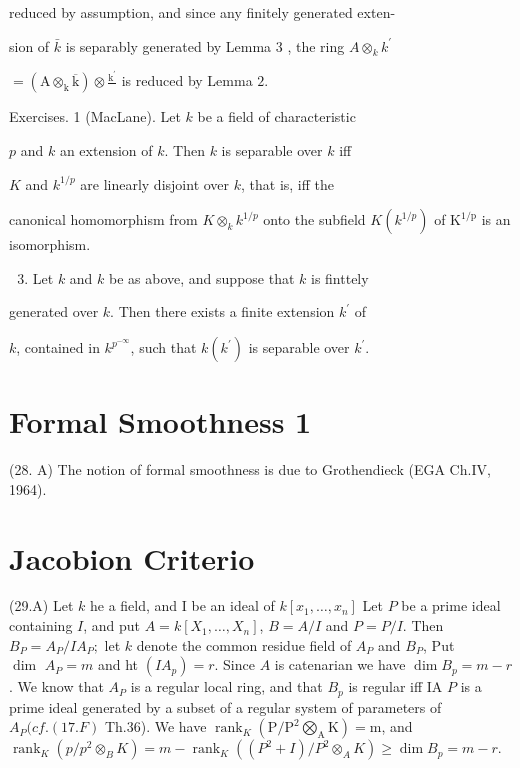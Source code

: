 reduced by assumption, and since any finitely generated exten-

sion of $\bar{k}$ is separably generated by Lemma 3 , the ring $A \otimes_{k} k^{\prime}$

$=\left(\mathrm{A} \otimes_{\mathrm{k}} \overline{\mathrm{k}}\right) \otimes \frac{\mathrm{k}^{\prime}}{}$ is reduced by Lemma $2 .$

Exercises. 1 (MacLane). Let $k$ be a field of characteristic

$p$ and $k$ an extension of $k$. Then $k$ is separable over $k$ iff

$K$ and $k^{1 / p}$ are linearly disjoint over $k$, that is, iff the

canonical homomorphism from $K \otimes_{k} k^{1 / p}$ onto the subfield $K\left(k^{1 / p}\right)$ of $\mathrm{K}^{1 / \mathrm{p}}$ is an isomorphism.

\begin{enumerate}
  \setcounter{enumi}{2}
  \item Let $k$ and $k$ be as above, and suppose that $k$ is finttely
\end{enumerate}
generated over $k$. Then there exists a finite extension $k^{\prime}$ of

$k$, contained in $k^{p^{-\infty}}$, such that $k\left(k^{\prime}\right)$ is separable over $k^{\prime}$.

\section{Formal Smoothness 1}
(28. A) The notion of formal smoothness is due to Grothendieck (EGA Ch.IV, 1964). 

\section{Jacobion Criterio}
(29.A) Let $k$ he a field, and I be an ideal of $k\left[x_{1}, \ldots, x_{n}\right]$ Let $P$ be a prime ideal containing $I$, and put $A=k\left[X_{1}, \ldots, X_{n}\right]$, $B=A / I$ and $P=P / I$. Then $B_{P}=A_{P} / I A_{P} ;$ let $k$ denote the common residue field of $A_{P}$ and $B_{P}$, Put $\operatorname{dim~} A_{P}=m$ and ht $\left(I A_{p}\right)=r$. Since $A$ is catenarian we have $\operatorname{dim} B_{p}=m-r$. We know that $A_{P}$ is a regular local ring, and that $B_{p}$ is regular iff IA $P$ is a prime ideal generated by a subset of a regular system of parameters of $A_{P}(c f .(17 . F)$ Th.36). We have $\operatorname{rank}_{K}\left(\mathrm{P} / \mathrm{P}^{2} \bigotimes_{\mathrm{A}} \mathrm{K}\right)=\mathrm{m}$, and $\operatorname{rank}_{K}\left(p / p^{2} \otimes_{B} K\right)=m-\operatorname{rank}_{K}\left(\left(P^{2}+I\right) / P^{2} \otimes_{A} K\right) \geqslant \operatorname{dim} B_{p}=m-r .$

